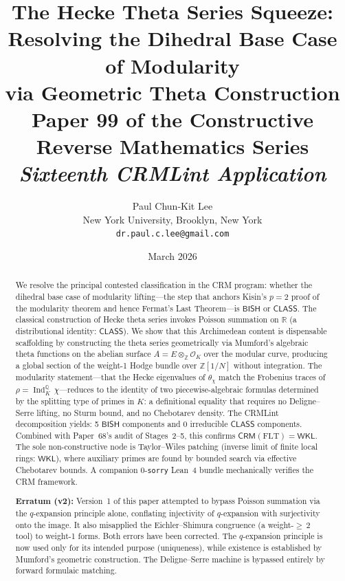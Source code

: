\documentclass[11pt,a4paper]{article}
\title{\textbf{The Hecke Theta Series Squeeze:\\
Resolving the Dihedral Base Case of Modularity\\
via Geometric Theta Construction}\\[6pt]
\large Paper 99 of the Constructive Reverse Mathematics Series\\[6pt]
\normalsize\textit{Sixteenth CRMLint Application}}
\author{Paul Chun-Kit Lee\\
\small New York University, Brooklyn, New York\\
\small\texttt{dr.paul.c.lee@gmail.com}}
\date{March 2026}
\theoremstyle{plain}
\theoremstyle{definition}
\newcommand{\BISH}{\textsf{BISH}}
\newcommand{\WKL}{\textsf{WKL}}
\newcommand{\CLASS}{\textsf{CLASS}}
\newcommand{\CRM}{\textsf{CRM}}
\newcommand{\Z}{\mathbb{Z}}
\newcommand{\Q}{\mathbb{Q}}
\newcommand{\R}{\mathbb{R}}
\DeclareMathOperator{\Ind}{Ind}
\begin{document}
\maketitle

\begin{abstract}
We resolve the principal contested classification in the CRM program: whether the dihedral base case of modularity lifting---the step that anchors Kisin's $p = 2$ proof of the modularity theorem and hence Fermat's Last Theorem---is $\BISH$ or $\CLASS$.
The classical construction of Hecke theta series invokes Poisson summation on $\R$ (a distributional identity: $\CLASS$).
We show that this Archimedean content is dispensable scaffolding by constructing the theta series geometrically via Mumford's algebraic theta functions on the abelian surface $A = E \otimes_{\Z} \mathcal{O}_K$ over the modular curve, producing a global section of the weight-1 Hodge bundle over $\Z[1/N]$ without integration.
The modularity statement---that the Hecke eigenvalues of $\theta_\chi$ match the Frobenius traces of $\rho = \Ind_K^\Q\, \chi$---reduces to the identity of two piecewise-algebraic formulas determined by the splitting type of primes in $K$: a definitional equality that requires no Deligne--Serre lifting, no Sturm bound, and no Chebotarev density.
The CRMLint decomposition yields: 5 $\BISH$ components and 0 irreducible $\CLASS$ components.
Combined with Paper~68's audit of Stages~2--5, this confirms $\CRM(\mathrm{FLT}) = \WKL$.
The sole non-constructive node is Taylor--Wiles patching (inverse limit of finite local rings: $\WKL$), where auxiliary primes are found by bounded search via effective Chebotarev bounds.
A companion 0-\texttt{sorry} Lean~4 bundle mechanically verifies the CRM framework.

\medskip
\noindent\textbf{Erratum (v2):} Version~1 of this paper attempted to bypass Poisson summation via the $q$-expansion principle alone, conflating injectivity of $q$-expansion with surjectivity onto the image.
It also misapplied the Eichler--Shimura congruence (a weight-${\geq}\,2$ tool) to weight-1 forms.
Both errors have been corrected.
The $q$-expansion principle is now used only for its intended purpose (uniqueness), while existence is established by Mumford's geometric construction.
The Deligne--Serre machine is bypassed entirely by forward formulaic matching.
\end{abstract}

\tableofcontents
\newpage

\end{document}

